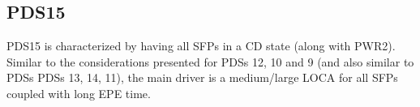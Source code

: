 \subsection{PDS15}
PDS15 is characterized by having all SFPs in a CD state (along with PWR2). Similar to the considerations 
presented for PDSs 12, 10 and 9 (and also
similar to PDSs PDSs 13, 14, 11), the main driver is a medium/large LOCA for all SFPs coupled with long EPE time.

